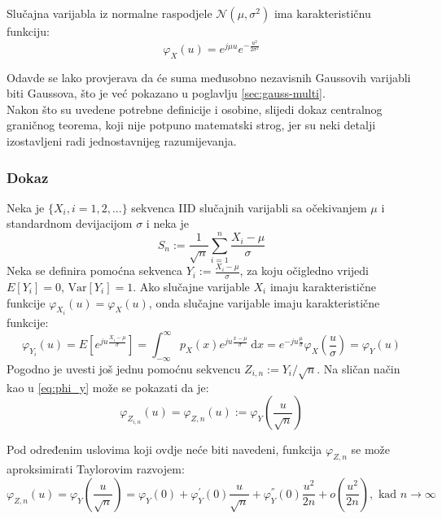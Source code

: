 \begin{property}
  Slučajna varijabla iz normalne raspodjele $\mathcal{N}(\mu, \sigma^2)$ ima
  karakterističnu funkciju:
  \begin{equation} \label{eq:char-norm}
    \varphi_X(u) = e^{j\mu u} e^{-\frac{u^2}{2\sigma^2}}
  \end{equation}
\end{property}

Odavde se lako provjerava da će suma međusobno nezavisnih Gaussovih varijabli
biti Gaussova, što je već pokazano u poglavlju \ref{sec:gauss-multi}. \\

Nakon što su uvedene potrebne definicije i osobine, slijedi dokaz centralnog
graničnog teorema, koji nije potpuno matematski strog, jer su neki detalji
izostavljeni radi jednostavnijeg razumijevanja. \\

\subsubsection{Dokaz}

Neka je $\{X_i, i=1,2,...\}$ sekvenca IID slučajnih varijabli sa očekivanjem
$\mu$ i standardnom devijacijom $\sigma$ i neka je
\begin{equation}
  S_n := \frac{1}{\sqrt{n}} \sum_{i=1}^{n} \frac{X_i-\mu}{\sigma}
\end{equation}
Neka se definira pomoćna sekvenca $Y_i := \frac{X_i-\mu}{\sigma}$, za koju
očigledno vrijedi $E[Y_i] = 0$, $\text{Var}[Y_i] = 1$. Ako slučajne varijable
$X_i$ imaju karakteristične funkcije $\varphi_{X_i}(u) = \varphi_X(u)$, onda
slučajne varijable imaju karakteristične funkcije:
\begin{equation} \label{eq:phi_y}
  \varphi_{Y_i}(u) = E\left[e^{ju\frac{X_i-\mu}{\sigma}}\right]
  = \int_{-\infty}^{\infty} p_X(x)e^{ju\frac{x-\mu}{\sigma}} \ \mathrm dx
  = e^{-ju\frac{\mu}{\sigma}} \varphi_X\left(\frac{u}{\sigma}\right)
  = \varphi_Y(u)
\end{equation}
Pogodno je uvesti još jednu pomoćnu sekvencu $Z_{i,n} := Y_i/\sqrt{n}$. Na
sličan način kao u \eqref{eq:phi_y} može se pokazati da je:
\begin{equation}
  \varphi_{Z_{i,n}}(u)
  = \varphi_{Z,n}(u) := \varphi_Y\left(\frac{u}{\sqrt{n}}\right)
\end{equation}

Pod određenim uslovima koji ovdje neće biti navedeni, funkcija $\varphi_{Z,n}$
se može aproksimirati Taylorovim razvojem:
\begin{equation} \label{eq:taylor}
  \varphi_{Z,n}(u) = \varphi_Y\left(\frac{u}{\sqrt{n}}\right) 
  = \varphi_Y(0) + \varphi_Y^{'}(0)\frac{u}{\sqrt{n}}
  + \varphi_Y^{''}(0)\frac{u^2}{2n} + o\left(\frac{u^2}{2n}\right),
    \text{ kad } n\to\infty
\end{equation}

